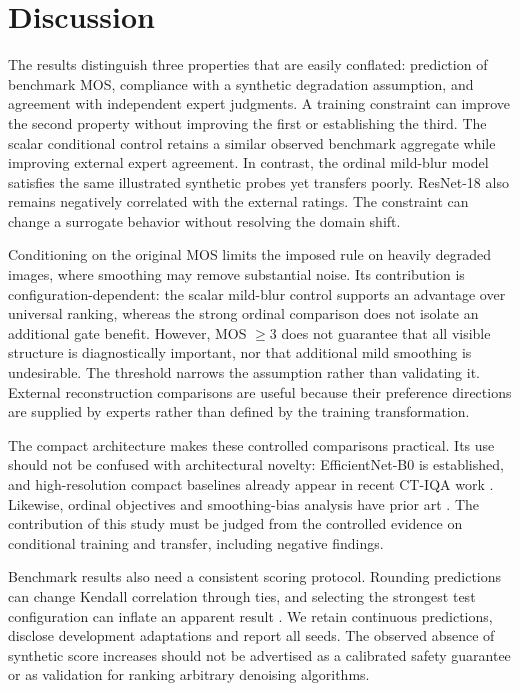 \documentclass[11pt]{article}
\begin{document}
\section{Discussion}
The results distinguish three properties that are easily conflated: prediction of benchmark MOS, compliance with a synthetic degradation assumption, and agreement with independent expert judgments. A training constraint can improve the second property without improving the first or establishing the third. The scalar conditional control retains a similar observed benchmark aggregate while improving external expert agreement. In contrast, the ordinal mild-blur model satisfies the same illustrated synthetic probes yet transfers poorly. ResNet-18 also remains negatively correlated with the external ratings. The constraint can change a surrogate behavior without resolving the domain shift.

Conditioning on the original MOS limits the imposed rule on heavily degraded images, where smoothing may remove substantial noise. Its contribution is configuration-dependent: the scalar mild-blur control supports an advantage over universal ranking, whereas the strong ordinal comparison does not isolate an additional gate benefit. However, MOS $\geq3$ does not guarantee that all visible structure is diagnostically important, nor that additional mild smoothing is undesirable. The threshold narrows the assumption rather than validating it. External reconstruction comparisons are useful because their preference directions are supplied by experts rather than defined by the training transformation.

The compact architecture makes these controlled comparisons practical. Its use should not be confused with architectural novelty: EfficientNet-B0 is established, and high-resolution compact baselines already appear in recent CT-IQA work \cite{medsiglipcode}. Likewise, ordinal objectives and smoothing-bias analysis have prior art \cite{rps,measurement}. The contribution of this study must be judged from the controlled evidence on conditional training and transfer, including negative findings.

Benchmark results also need a consistent scoring protocol. Rounding predictions can change Kendall correlation through ties, and selecting the strongest test configuration can inflate an apparent result \cite{measurement}. We retain continuous predictions, disclose development adaptations and report all seeds. The observed absence of synthetic score increases should not be advertised as a calibrated safety guarantee or as validation for ranking arbitrary denoising algorithms.
\end{document}
